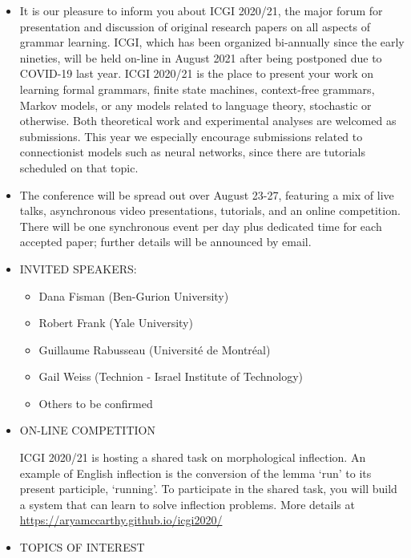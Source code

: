 \documentclass[prodmode,acmtecs]{acmsmall} %
\begin{document}
\begin{itemize}\item  It is our pleasure to inform you about ICGI 2020/21, the major forum for presentation and discussion of original research papers on all aspects of grammar learning. ICGI, which has been organized bi-annually since the early nineties, will be held on-line in August 2021 after being postponed due to COVID-19 last year. ICGI 2020/21 is the place to present your work on learning formal grammars, finite state machines, context-free grammars, Markov models, or any models related to language theory, stochastic or otherwise. Both theoretical work and experimental analyses are welcomed as submissions. This year we especially encourage submissions related to connectionist models such as neural networks, since there are tutorials scheduled on that topic.  
 
\item  The conference will be spread out over August 23-27, featuring a mix of live talks, asynchronous video presentations, tutorials, and an online competition. There will be one synchronous event per day plus dedicated time for each accepted paper; further details will be announced by email. 
 
\item  INVITED SPEAKERS:  
 
\begin{itemize}\item  Dana Fisman (Ben-Gurion University) 
\item  Robert Frank (Yale University) 
\item  Guillaume Rabusseau (Université de Montréal) 
\item  Gail Weiss (Technion - Israel Institute of Technology) 
\item  Others to be confirmed
\end{itemize} 
\item  ON-LINE COMPETITION 
 
 ICGI 2020/21 is hosting a shared task on morphological inflection. An example of English inflection is the conversion of the lemma ‘run’ to its present participle, ‘running’. To participate in the shared task, you will build a system that can learn to solve inflection problems. More details at \href{https://aryamccarthy.github.io/icgi2020/}{https://aryamccarthy.github.io/icgi2020/}  
 
\item  TOPICS OF INTEREST 
 

\end{itemize}
\end{document}
